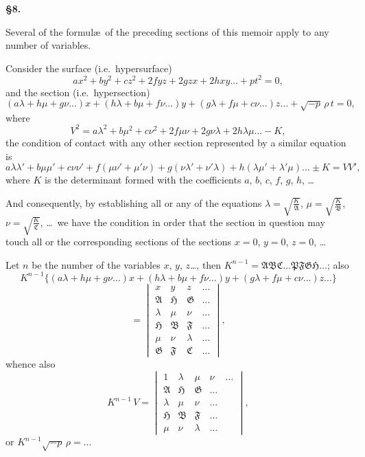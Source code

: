\documentclass[11pt,a4paper]{book}
\begin{document}
\newpage
\setcounter{page}{84}

\noindent\textbf{\S 8.}

Several of the formul\ae\ of the preceding sections of this memoir apply to any number of variables.

Consider the surface (i.e.\ hypersurface)
\[
ax^2+by^2+cz^2+2fyz+2gzx+2hxy\ldots+pt^2=0,
\]
and the section (i.e.\ hypersection)
\[
(a\lambda+h\mu+g\nu\ldots)x + (h\lambda+b\mu+f\nu\ldots)y + (g\lambda+f\mu+c\nu\ldots)z\ldots + \sqrt{-p}\,\rho\,t = 0,
\]
where
\[
V^2 = a\lambda^2+b\mu^2+c\nu^2+2f\mu\nu+2g\nu\lambda+2h\lambda\mu\ldots-K,
\]
the condition of contact with any other section represented by a similar equation is
\[
a\lambda\lambda'+b\mu\mu'+c\nu\nu'+f(\mu\nu'+\mu'\nu)+g(\nu\lambda'+\nu'\lambda)+h(\lambda\mu'+\lambda'\mu)\ldots \pm K = VV',
\]
where $K$ is the determinant formed with the coefficients $a$, $b$, $c$, $f$, $g$, $h$, \ldots

And consequently, by establishing all or any of the equations $\lambda=\sqrt{\tfrac{K}{\mathfrak{A}}}$, $\mu=\sqrt{\tfrac{K}{\mathfrak{B}}}$, $\nu=\sqrt{\tfrac{K}{\mathfrak{C}}}$, \ldots\ we have the condition in order that the section in question may touch all or the corresponding sections of the sections $x=0$, $y=0$, $z=0$, \ldots

Let $n$ be the number of the variables $x$, $y$, $z$\ldots, then $K^{n-1}=\mathfrak{A}\mathfrak{B}\mathfrak{C}\ldots\mathfrak{P}\mathfrak{F}\mathfrak{G}\mathfrak{H}\ldots$; also
\[
K^{n-1}\{(a\lambda+h\mu+g\nu\ldots)x+(h\lambda+b\mu+f\nu\ldots)y+(g\lambda+f\mu+c\nu\ldots)z\ldots\}
\]
\[
= \begin{vmatrix}
x & y & z & \ldots \\
\mathfrak{A} & \mathfrak{H} & \mathfrak{G} & \ldots \\
\lambda & \mu & \nu & \ldots \\
\mathfrak{H} & \mathfrak{B} & \mathfrak{F} & \ldots \\
\mu & \nu & \lambda & \ldots \\
\mathfrak{G} & \mathfrak{F} & \mathfrak{C} & \ldots
\end{vmatrix},
\]
whence also
\[
K^{n-1}\,V = \begin{vmatrix}
1 & \lambda & \mu & \nu & \ldots \\
\mathfrak{A} & \mathfrak{H} & \mathfrak{G} & \ldots \\
\lambda & \mu & \nu & \ldots \\
\mathfrak{H} & \mathfrak{B} & \mathfrak{F} & \ldots \\
\mu & \nu & \lambda & \ldots
\end{vmatrix},
\]
or $K^{n-1}\sqrt{-p}\,\rho = \ldots$
\end{document}
